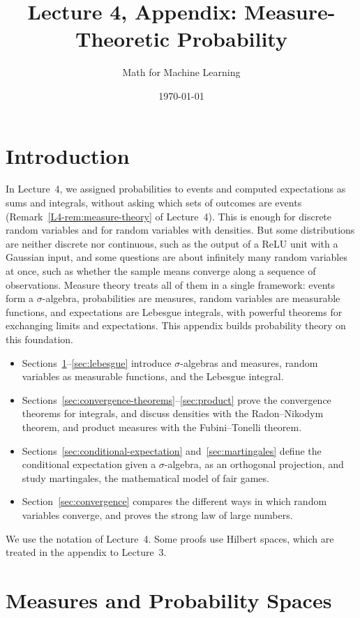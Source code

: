 \documentclass[11pt]{article}
\title{Lecture 4, Appendix: Measure-Theoretic Probability}
\author{Math for Machine Learning}
\date{\today}
\theoremstyle{definition}
\theoremstyle{plain}
\theoremstyle{remark}
\begin{document}
\maketitle
\tableofcontents

\section*{Introduction}

In Lecture~4, we assigned probabilities to events and computed expectations as sums and integrals, without asking which sets of outcomes are events (Remark~\ref{L4-rem:measure-theory} of Lecture~4). This is enough for discrete random variables and for random variables with densities. But some distributions are neither discrete nor continuous, such as the output of a ReLU unit with a Gaussian input, and some questions are about infinitely many random variables at once, such as whether the sample means converge along a sequence of observations. Measure theory treats all of them in a single framework: events form a $\sigma$-algebra, probabilities are measures, random variables are measurable functions, and expectations are Lebesgue integrals, with powerful theorems for exchanging limits and expectations. This appendix builds probability theory on this foundation.
\begin{itemize}
    \item Sections~\ref{sec:measures}--\ref{sec:lebesgue} introduce $\sigma$-algebras and measures, random variables as measurable functions, and the Lebesgue integral.
    \item Sections~\ref{sec:convergence-theorems}--\ref{sec:product} prove the convergence theorems for integrals, and discuss densities with the Radon--Nikodym theorem, and product measures with the Fubini--Tonelli theorem.
    \item Sections~\ref{sec:conditional-expectation} and~\ref{sec:martingales} define the conditional expectation given a $\sigma$-algebra, as an orthogonal projection, and study martingales, the mathematical model of fair games.
    \item Section~\ref{sec:convergence} compares the different ways in which random variables converge, and proves the strong law of large numbers.
\end{itemize}
We use the notation of Lecture~4. Some proofs use Hilbert spaces, which are treated in the appendix to Lecture~3.

\section{Measures and Probability Spaces}\label{sec:measures}
\end{document}
